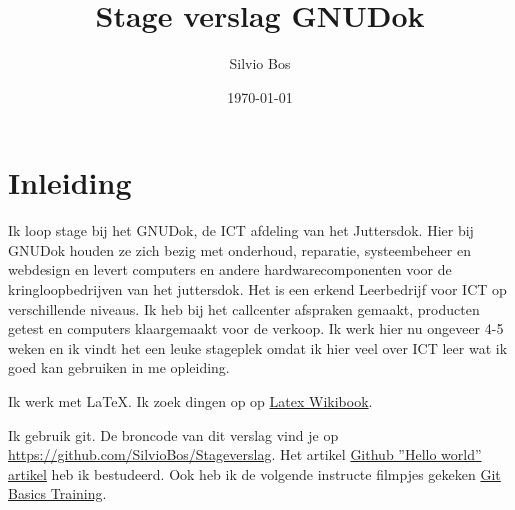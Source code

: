 \documentclass[12pt,a4paper]{article}
\begin{document}
\title{Stage verslag GNUDok}
\author{Silvio Bos}
\date{\today}
\maketitle
\section{Inleiding}
Ik loop stage bij het GNUDok, de ICT afdeling van het Juttersdok.
Hier bij GNUDok houden ze zich bezig met onderhoud, reparatie, systeembeheer en webdesign en levert computers en andere 
hardwarecomponenten voor de kringloopbedrijven van het juttersdok. 
Het is een erkend Leerbedrijf voor ICT op verschillende niveaus.
Ik heb bij het callcenter afspraken gemaakt, producten getest en computers klaargemaakt voor de verkoop.
Ik werk hier nu ongeveer 4-5 weken en ik vindt het een leuke stageplek omdat ik hier veel over ICT leer wat ik goed kan gebruiken in me opleiding.

Ik werk met \LaTeX{}.  Ik zoek dingen op op \href{https://en.wikibooks.org/wiki/LaTeX}{Latex Wikibook}.

Ik gebruik git.  De broncode van dit verslag vind je op \url{https://github.com/SilvioBos/Stageverslag}. Het artikel \href{https://guides.github.com/activities/hello-world/}{Github ''Hello world'' artikel} heb ik bestudeerd.  
Ook heb ik de volgende instructe filmpjes gekeken \href{https://www.youtube.com/watch?v=8oRjP8yj2Wo&list=PLg7s6cbtAD165JTRsXh8ofwRw0PqUnkVH}{Git Basics Training}.
\end{document}
